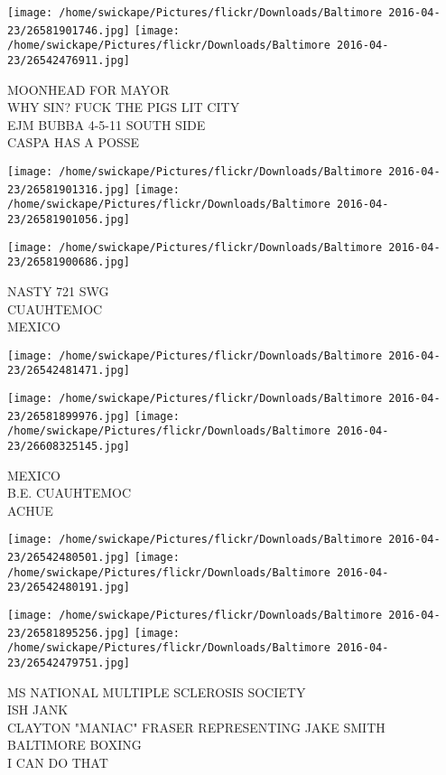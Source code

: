 \documentclass[10pt,letterpaper]{article}
\begin{document}
\texttt{[image: /home/swickape/Pictures/flickr/Downloads/Baltimore 2016-04-23/26581901746.jpg]}
\texttt{[image: /home/swickape/Pictures/flickr/Downloads/Baltimore 2016-04-23/26542476911.jpg]}

MOONHEAD FOR MAYOR\\
WHY SIN?  FUCK THE PIGS LIT CITY\\
EJM BUBBA 4{-}5{-}11 SOUTH SIDE\\
CASPA HAS A POSSE\\
\pagebreak

\texttt{[image: /home/swickape/Pictures/flickr/Downloads/Baltimore 2016-04-23/26581901316.jpg]}
\texttt{[image: /home/swickape/Pictures/flickr/Downloads/Baltimore 2016-04-23/26581901056.jpg]}

\texttt{[image: /home/swickape/Pictures/flickr/Downloads/Baltimore 2016-04-23/26581900686.jpg]}

NASTY 721 SWG\\
CUAUHTEMOC\\
MEXICO\\
\pagebreak

\texttt{[image: /home/swickape/Pictures/flickr/Downloads/Baltimore 2016-04-23/26542481471.jpg]}

\vspace{0.25in}
\texttt{[image: /home/swickape/Pictures/flickr/Downloads/Baltimore 2016-04-23/26581899976.jpg]}
\texttt{[image: /home/swickape/Pictures/flickr/Downloads/Baltimore 2016-04-23/26608325145.jpg]}

MEXICO\\
B.E. CUAUHTEMOC\\
ACHUE\\
\pagebreak

\texttt{[image: /home/swickape/Pictures/flickr/Downloads/Baltimore 2016-04-23/26542480501.jpg]}
\texttt{[image: /home/swickape/Pictures/flickr/Downloads/Baltimore 2016-04-23/26542480191.jpg]}

\texttt{[image: /home/swickape/Pictures/flickr/Downloads/Baltimore 2016-04-23/26581895256.jpg]}
\texttt{[image: /home/swickape/Pictures/flickr/Downloads/Baltimore 2016-04-23/26542479751.jpg]}

MS NATIONAL MULTIPLE SCLEROSIS SOCIETY\\
ISH JANK\\
CLAYTON "MANIAC" FRASER REPRESENTING JAKE SMITH BALTIMORE BOXING\\
I CAN DO THAT\\
\pagebreak
\end{document}

